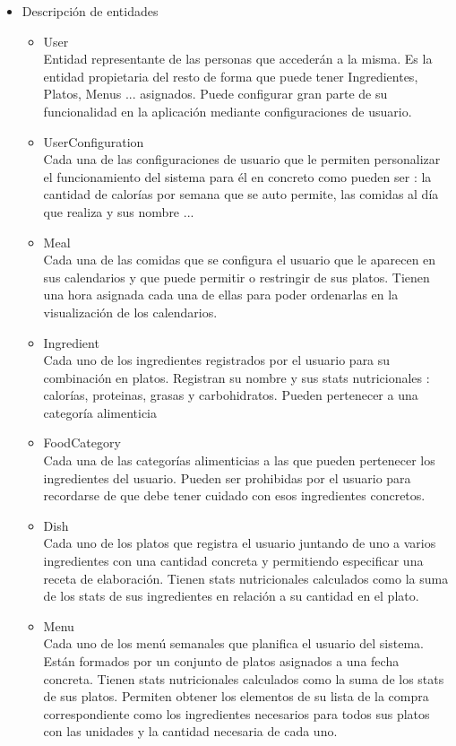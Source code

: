 \documentclass[12pt, a4paper, twoside]{book}
\begin{document}
	\begin{itemize}
		\item Descripción de entidades
		\begin{itemize}
			\item User \\Entidad representante de las personas que accederán a la misma. Es la entidad propietaria del resto de forma que puede tener Ingredientes, Platos, Menus ... asignados. Puede configurar gran parte de su funcionalidad en la aplicación mediante configuraciones de usuario.
			\item UserConfiguration \\ Cada una de las configuraciones de usuario que le permiten personalizar el funcionamiento del sistema para él en concreto como pueden ser : la cantidad de calorías por semana que se auto permite, las comidas al día que realiza y sus nombre ...
			\item Meal \\ Cada una de las comidas que se configura el usuario que le aparecen en sus calendarios y que puede permitir o restringir de sus platos. Tienen una hora asignada cada una de ellas para poder ordenarlas en la visualización de los calendarios.
			\item Ingredient \\ Cada uno de los ingredientes registrados por el usuario para su combinación en platos. Registran su nombre y sus stats nutricionales : calorías, proteinas, grasas y carbohidratos. Pueden pertenecer a una categoría alimenticia
			\item FoodCategory \\ Cada una de las categorías alimenticias a las que pueden pertenecer los ingredientes del usuario. Pueden ser prohibidas por el usuario para recordarse de que debe tener cuidado con esos ingredientes concretos.
			\item Dish \\ Cada uno de los platos que registra el usuario juntando de uno a varios ingredientes con una cantidad concreta y permitiendo especificar una receta de elaboración. Tienen stats nutricionales calculados como la suma de los stats de sus ingredientes en relación a su cantidad en el plato.
			\item Menu \\ Cada uno de los menú semanales que planifica el usuario del sistema. Están formados por un conjunto de platos asignados a una fecha concreta. Tienen stats nutricionales calculados como la suma de los stats de sus platos. Permiten obtener los elementos de su lista de la compra correspondiente como los ingredientes necesarios para todos sus platos con las unidades y la cantidad necesaria de cada uno.

\end{itemize}
\end{itemize}
\end{document}
